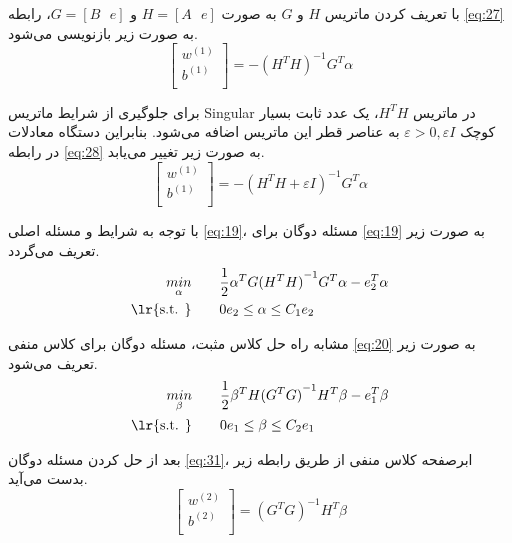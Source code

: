 با تعریف کردن ماتریس $H$ و $G$ به صورت $H=[A\text{ }e]$ و $G=[B\text{ }e]$، رابطه \ref{eq:27} به صورت زیر بازنویسی می‌شود.
\begin{equation}
\left[ \begin{matrix}
{{w}^{(1)}} \\
{{b}^{(1)}} \\
\end{matrix} \right]= -{{({{H}^{T}}H)}^{-1}}{{G}^{T}}\alpha
\label{eq:28}
\end{equation}

برای جلوگیری از شرایط ماتریس \gls{Singular} در ماتریس $H^{T}H$، یک عدد ثابت بسیار کوچک  $\varepsilon > 0, \varepsilon I$ به عناصر قطر این ماتریس اضافه می‌شود. بنابراین دستگاه معادلات در رابطه \ref{eq:28} به صورت زیر تغییر می‌یابد.
\begin{equation}
\left[ \begin{matrix}
{{w}^{(1)}} \\
{{b}^{(1)}} \\
\end{matrix}\right]= -{{({{H}^{T}}H + \varepsilon I)}^{-1}}{{G}^{T}}\alpha
\label{eq:29}
\end{equation}

با توجه به شرایط  و مسئله اصلی \ref{eq:19}، مسئله دوگان برای \ref{eq:19} به صورت زیر تعریف می‌گردد.
\begin{equation}
\begin{split}
\mathop{{ min}}\limits_{\alpha} \qquad & \frac{1}{2}{{\alpha }^{T}}G{{({{H}^{T}}H)}^{-1}}{{G}^{T}}\alpha -e_{2}^{T}\alpha  \\
\textrm{\lr{s.t. }} \qquad & 0{{e}_{2}}\le \alpha \le {{C}_{1}}{{e}_{2}}
\end{split}
\label{eq:30}
\end{equation}

مشابه راه حل کلاس مثبت، مسئله دوگان برای کلاس منفی \ref{eq:20} به صورت زیر تعریف می‌شود.
\begin{equation}
\begin{split}
\mathop{{ min}}\limits_{\beta} \qquad & \frac{1}{2}{{\beta }^{T}}H{{({{G}^{T}}G)}^{-1}}{{H}^{T}}\beta -e_{1}^{T}\beta  \\
\textrm{\lr{s.t. }} \qquad & 0{{e}_{1}}\le \beta \le {{C}_{2}}{{e}_{1}}
\end{split}
\label{eq:31}
\end{equation}

بعد از حل کردن مسئله دوگان \ref{eq:31}، ابرصفحه کلاس منفی از طریق رابطه زیر بدست می‌آید.
\begin{equation}
\left[ \begin{matrix}
{{w}^{(2)}} \\
{{b}^{(2)}} \\
\end{matrix}\right]= {{({{G}^{T}}G)}^{-1}}{{H}^{T}}\beta
\label{eq:32}
\end{equation}

